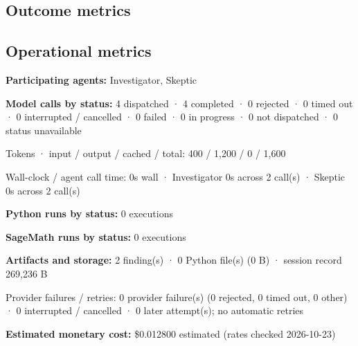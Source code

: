 \documentclass[11pt]{article}
\begin{document}
\subsection{Outcome metrics}
\subsection{Operational metrics}
\textbf{Participating agents:} Investigator, Skeptic\par
\textbf{Model calls by status:} 4 dispatched · 4 completed · 0 rejected · 0 timed out · 0 interrupted / cancelled · 0 failed · 0 in progress · 0 not dispatched · 0 status unavailable\par
Tokens · input / output / cached / total: 400 / 1,200 / 0 / 1,600\par
Wall-clock / agent call time: 0s wall · Investigator 0s across 2 call(s) · Skeptic 0s across 2 call(s)\par
\textbf{Python runs by status:} 0 executions\par
\textbf{SageMath runs by status:} 0 executions\par
\textbf{Artifacts and storage:} 2 finding(s) · 0 Python file(s) (0 B) · session record 269,236 B\par
Provider failures / retries: 0 provider failure(s) (0 rejected, 0 timed out, 0 other) · 0 interrupted / cancelled · 0 later attempt(s); no automatic retries\par
\textbf{Estimated monetary cost:} \$0.012800 estimated (rates checked 2026-10-23)\par
\end{document}
